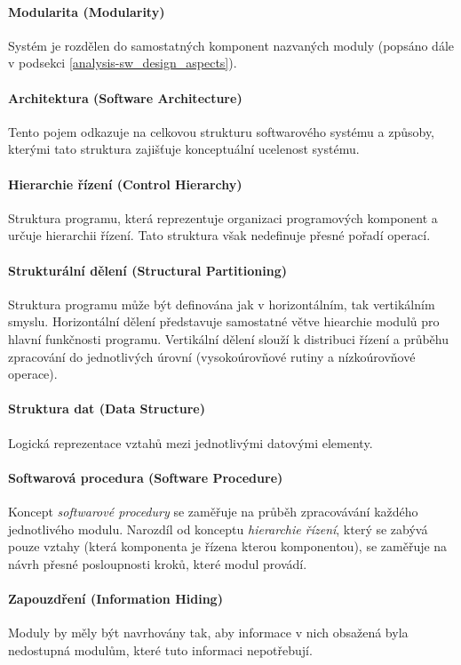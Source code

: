 \paragraph{Modularita (Modularity)} Systém je rozdělen do samostatných komponent nazvaných moduly (popsáno dále v podsekci \ref{analysis-sw_design_aspects}).

\paragraph{Architektura (Software Architecture)} Tento pojem odkazuje na celkovou strukturu softwarového systému a způsoby, kterými tato struktura zajišťuje konceptuální ucelenost systému.

\paragraph{Hierarchie řízení (Control Hierarchy)} Struktura programu, která reprezentuje organizaci programových komponent a určuje hierarchii řízení. Tato struktura však nedefinuje přesné pořadí operací.

\paragraph{Strukturální dělení (Structural Partitioning)} Struktura programu může být definována jak v horizontálním, tak vertikálním smyslu. Horizontální dělení představuje samostatné větve hiearchie modulů pro hlavní funkčnosti programu. Vertikální dělení slouží k distribuci řízení a průběhu zpracování do jednotlivých úrovní (vysokoúrovňové rutiny a nízkoúrovňové operace).

\paragraph{Struktura dat (Data Structure)} Logická reprezentace vztahů mezi jednotlivými datovými elementy.

\paragraph{Softwarová procedura (Software Procedure)} Koncept \emph{softwarové procedury} se zaměřuje na průběh zpracovávání každého jednotlivého modulu. Narozdíl od konceptu \emph{hierarchie řízení}, který se zabývá pouze vztahy (která komponenta je řízena kterou komponentou), se zaměřuje na návrh přesné posloupnosti kroků, které modul provádí.

\paragraph{Zapouzdření (Information Hiding)} Moduly by měly být navrhovány tak, aby informace v nich obsažená byla nedostupná modulům, které tuto informaci nepotřebují.

